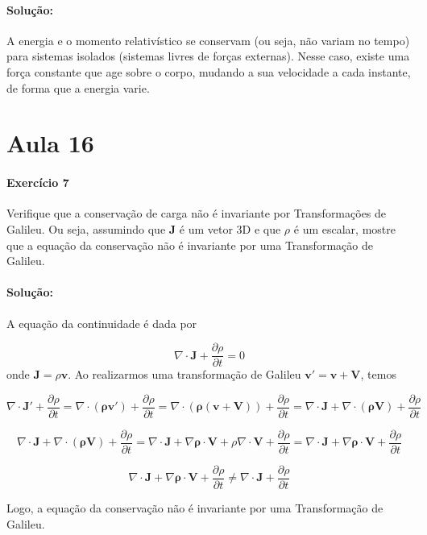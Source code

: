\documentclass[10pt,a4paper]{article}
\begin{document}
\paragraph{Solução:} A energia e o momento relativístico se conservam (ou seja, não variam no tempo) para sistemas isolados (sistemas livres de forças externas). Nesse caso, existe uma força constante que age sobre o corpo, mudando a sua velocidade a cada instante, de forma que a energia varie.

\section*{Aula 16}
\paragraph{Exercício 7} Verifique que a conservação de carga não é invariante por Transformações de Galileu. Ou seja, assumindo que \textbf{J} é um vetor 3D e que $\rho$ é um escalar, mostre que a equação da conservação não é invariante por uma Transformação de Galileu.

\paragraph{Solução:} A equação da continuidade é dada por

\begin{equation*}
	\nabla\cdot\mathbf{J} + \dfrac{\partial \rho}{\partial t} = 0
\end{equation*}
onde $ \mathbf{J} = \rho\mathbf{v} $. Ao realizarmos uma transformação de Galileu $ \mathbf{v'} = \mathbf{v} + \mathbf{V} $, temos

\begin{equation*}
	\nabla\cdot\mathbf{J'} + \dfrac{\partial \rho}{\partial t} = \nabla\cdot\mathbf{(\rho\mathbf{v}')} + \dfrac{\partial \rho}{\partial t} = \nabla\cdot\mathbf{(\rho(\mathbf{v} +\mathbf{V}))} + \dfrac{\partial \rho}{\partial t} = \nabla\cdot\mathbf{J} + \nabla\cdot\mathbf{(\rho\mathbf{V})} + \dfrac{\partial \rho}{\partial t}
\end{equation*}

\begin{equation*}
	\nabla\cdot\mathbf{J} + \nabla\cdot\mathbf{(\rho\mathbf{V})} + \dfrac{\partial \rho}{\partial t} = \nabla\cdot\mathbf{J} + \nabla\mathbf{\rho}\cdot\mathbf{V} + \rho\nabla\cdot\mathbf{\mathbf{V}} + \dfrac{\partial \rho}{\partial t} = \nabla\cdot\mathbf{J} + \nabla\mathbf{\rho}\cdot\mathbf{V} + \dfrac{\partial \rho}{\partial t}
\end{equation*}

\begin{equation*}
	\nabla\cdot\mathbf{J} + \nabla\mathbf{\rho}\cdot\mathbf{V} + \dfrac{\partial \rho}{\partial t} \neq \nabla\cdot\mathbf{J} + \dfrac{\partial \rho}{\partial t}
\end{equation*}

Logo, a equação da conservação não é invariante por uma Transformação de Galileu.
\end{document}
